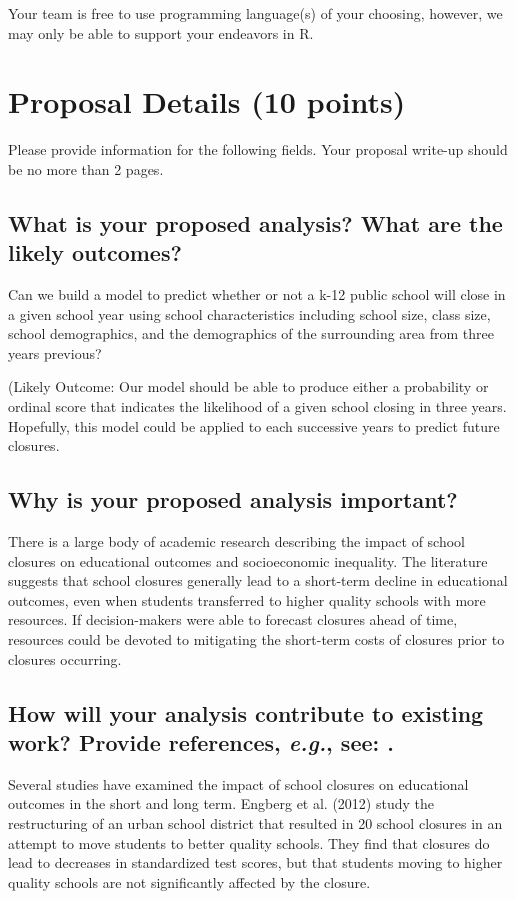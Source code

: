 \documentclass[twoside,11pt]{article}
\begin{document}
Your team is free to use programming language(s) of your choosing, however, we may only be able to support your endeavors in R.

\section{Proposal Details (10 points)} \label{details}
Please provide information for the following fields. Your proposal write-up should be no more than 2 pages.

\subsection{What is your proposed analysis? What are the likely outcomes?}

  Can we build a model to predict whether or not a k-12 public school will close in a given school year using school characteristics including school size, class size, school demographics, and the demographics of the surrounding area from three years previous?

\bold({Likely Outcome:} Our model should be able to produce either a probability or ordinal score that indicates the likelihood of a given school closing in three years. Hopefully, this model could be applied to each successive years to predict future closures.



\subsection{Why is your proposed analysis important?}
There is a large body of academic research describing the impact of school closures on educational outcomes and socioeconomic inequality. The literature suggests that school closures generally lead to a short-term decline in educational outcomes, even when students transferred to higher quality schools with more resources. If decision-makers were able to forecast closures ahead of time, resources could be devoted to mitigating the short-term costs of closures prior to closures occurring.


\subsection{How will your analysis contribute to existing work? Provide references, \emph{e.g.}, see: \cite{cite1}.}

Several studies have examined the impact of school closures on educational outcomes in the short and long term. Engberg et al. (2012) study the restructuring of an urban school district that resulted in 20 school closures in an attempt to move students to better quality schools. They find that closures do lead to decreases in standardized test scores, but that students moving to higher quality schools are not significantly affected by the closure. 
\end{document}
